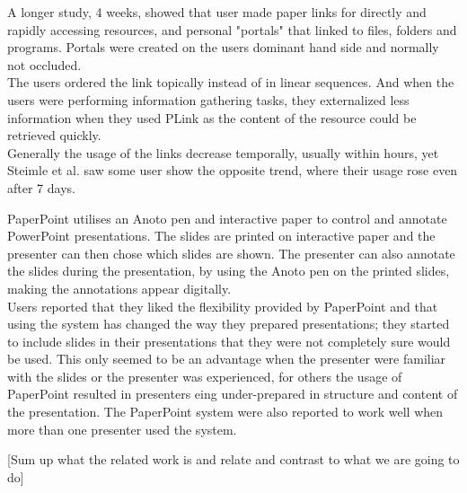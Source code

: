 A longer study, 4 weeks, showed that user made paper links for directly and rapidly accessing resources, and personal "portals" that linked to files, folders and programs. Portals were created on the users dominant hand side and normally not occluded. \\
The users ordered the link topically instead of in linear sequences. And when the users were performing information gathering tasks, they externalized less information when they used PLink as the content of the resource could be retrieved quickly. \\
Generally the usage of the links decrease temporally, usually within hours, yet Steimle et al. saw some user show the opposite trend, where their usage rose even after 7 days. \par

PaperPoint \cite{Signer:2007:PPP:1226969.1226981} utilises an Anoto\cite{anoto2011anoto} pen and interactive paper to control and annotate PowerPoint  presentations. The slides are printed on interactive paper and the presenter can then chose which slides are shown. The presenter can also annotate the slides during the presentation, by using the Anoto pen on the printed slides, making the annotations appear digitally. \\

Users reported that they liked the flexibility provided by PaperPoint and that using the system has changed the way they prepared presentations; they started to include slides in their presentations that they were not completely sure would be used. This only seemed to be an advantage when the presenter were familiar with the slides or the presenter was experienced, for others the usage of PaperPoint resulted in presenters eing under-prepared in structure and content of the presentation. The PaperPoint system were also reported to work well when more than one presenter used the system.\\

\par






[Sum up what the related work is and relate and contrast to what we are going to do]


